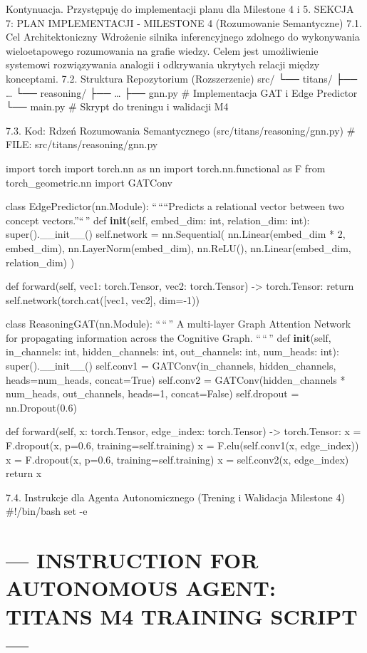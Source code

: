 \documentclass[letterpaper,twocolumn]{article}
\author{}
\date{}
\begin{document}
Kontynuacja. Przystępuję do implementacji planu dla Milestone 4 i 5.
SEKCJA 7: PLAN IMPLEMENTACJI - MILESTONE 4 (Rozumowanie Semantyczne)
7.1. Cel Architektoniczny Wdrożenie silnika inferencyjnego zdolnego do
wykonywania wieloetapowego rozumowania na grafie wiedzy. Celem jest
umożliwienie systemowi rozwiązywania analogii i odkrywania ukrytych
relacji między konceptami. 7.2. Struktura Repozytorium (Rozszerzenie)
src/ └── titans/ ├── \ldots{} └── reasoning/ ├── \ldots{} ├── gnn.py \#
Implementacja GAT i Edge Predictor └── main.py \# Skrypt do treningu i
walidacji M4

7.3. Kod: Rdzeń Rozumowania Semantycznego (src/titans/reasoning/gnn.py)
\# FILE: src/titans/reasoning/gnn.py

import torch import torch.nn as nn import torch.nn.functional as F from
torch\_geometric.nn import GATConv

class EdgePredictor(nn.Module): ``\,````Predicts a relational vector
between two concept vectors.''``\,'' def \textbf{init}(self, embed\_dim:
int, relation\_dim: int): super().\_\_init\_\_() self.network =
nn.Sequential( nn.Linear(embed\_dim * 2, embed\_dim),
nn.LayerNorm(embed\_dim), nn.ReLU(), nn.Linear(embed\_dim,
relation\_dim) )

def forward(self, vec1: torch.Tensor, vec2: torch.Tensor)
-\textgreater{} torch.Tensor: return self.network(torch.cat({[}vec1,
vec2{]}, dim=-1))

class ReasoningGAT(nn.Module): ``\,``\,'' A multi-layer Graph Attention
Network for propagating information across the Cognitive Graph.
``\,``\,'' def \textbf{init}(self, in\_channels: int, hidden\_channels:
int, out\_channels: int, num\_heads: int): super().\_\_init\_\_()
self.conv1 = GATConv(in\_channels, hidden\_channels, heads=num\_heads,
concat=True) self.conv2 = GATConv(hidden\_channels * num\_heads,
out\_channels, heads=1, concat=False) self.dropout = nn.Dropout(0.6)

def forward(self, x: torch.Tensor, edge\_index: torch.Tensor)
-\textgreater{} torch.Tensor: x = F.dropout(x, p=0.6,
training=self.training) x = F.elu(self.conv1(x, edge\_index)) x =
F.dropout(x, p=0.6, training=self.training) x = self.conv2(x,
edge\_index) return x

7.4. Instrukcje dla Agenta Autonomicznego (Trening i Walidacja Milestone
4) \#!/bin/bash set -e

\hypertarget{instruction-for-autonomous-agent-titans-m4-training-script}{%
\section{--- INSTRUCTION FOR AUTONOMOUS AGENT: TITANS M4 TRAINING SCRIPT
---}\label{instruction-for-autonomous-agent-titans-m4-training-script}}
\end{document}

